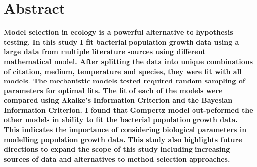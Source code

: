 \documentclass[11pt]{article}
\begin{document}
    \section{Abstract}
	\textbf{Model selection in ecology is a powerful alternative to hypothesis testing. In this study I fit bacterial population growth data using a large data from multiple literature sources using different mathematical model. After splitting the data into unique combinations of citation, medium, temperature and species, they were fit with all models. The mechanistic models tested required random sampling of parameters for optimal fits. The fit of each of the models were compared using Akaike's Information Criterion and the Bayesian Information Criterion. I found that Gompertz model out-peformed the other models in ability to fit the bacterial population growth data. This indicates the importance of considering biological parameters in modelling population growth data. This study also highlights future directions to expand the scope of this study including increasing sources of data and alternatives to method selection approaches.}
	
\end{document}
